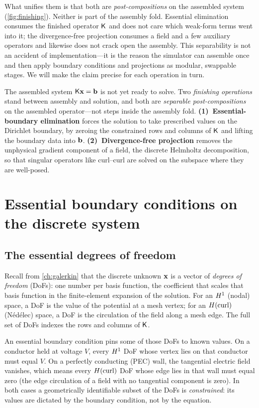 What unifies them is that both are \emph{post-compositions} on the assembled
system (\cref{fig:finishing}). Neither is part of the assembly fold. Essential
elimination consumes the finished operator $\mathsf{K}$ and does not care which
weak-form terms went into it; the divergence-free projection consumes a field and
a few auxiliary operators and likewise does not crack open the assembly. This
separability is not an accident of implementation---it is the reason the
simulator can assemble once and then apply boundary conditions and projections as
modular, swappable stages. We will make the claim precise for each operation in
turn.

\begin{keyidea}
The assembled system $\mathsf{K}\mathbf{x}=\mathbf{b}$ is not yet ready to solve. Two
\emph{finishing operations} stand between assembly and solution, and both are
\emph{separable post-compositions} on the assembled operator---not steps inside
the assembly fold. \textbf{(1)~Essential-boundary elimination} forces the
solution to take prescribed values on the Dirichlet boundary, by zeroing the
constrained rows and columns of $\mathsf{K}$ and lifting the boundary data into
$\mathbf{b}$. \textbf{(2)~Divergence-free projection} removes the unphysical gradient
component of a field, the discrete Helmholtz decomposition, so that singular
operators like curl--curl are solved on the subspace where they are well-posed.
\end{keyidea}

\section{Essential boundary conditions on the discrete system}
\label{sec:essential}

\subsection{The essential degrees of freedom}

Recall from \cref{ch:galerkin} that the discrete unknown $\mathbf{x}$ is a vector of
\emph{degrees of freedom} (DoFs): one number per basis function, the coefficient
that scales that basis function in the finite-element expansion of the solution.
For an $H^1$ (nodal) space, a DoF is the value of the potential at a mesh
vertex; for an $H(\mathrm{curl})$ (Nédélec) space, a DoF is the circulation of the field
along a mesh edge. The full set of DoFs indexes the rows and columns of
$\mathsf{K}$.

An essential boundary condition pins some of those DoFs to known values. On a
conductor held at voltage $V$, every $H^1$ DoF whose vertex lies on that
conductor must equal $V$. On a perfectly conducting (PEC) wall, the tangential
electric field vanishes, which means every $H(\mathrm{curl})$ DoF whose edge lies in that
wall must equal zero (the edge circulation of a field with no tangential
component is zero). In both cases a geometrically identifiable subset of the DoFs
is \emph{constrained}: its values are dictated by the boundary condition, not by
the equation.


